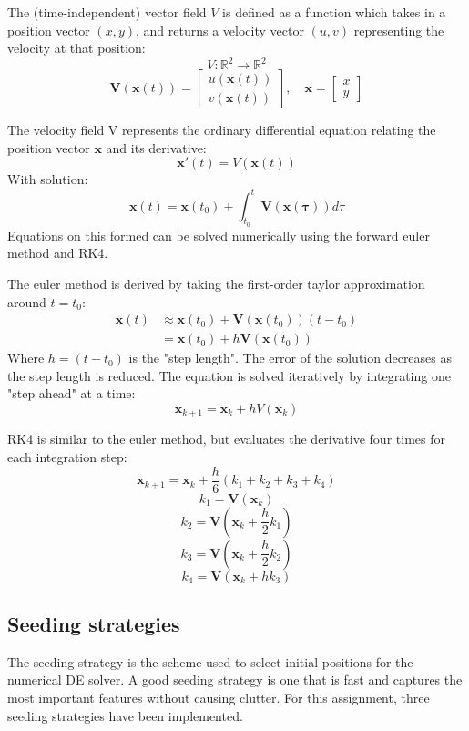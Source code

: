 \documentclass{article}
\begin{document}
The (time-independent) vector field $V$ is defined as a function which takes in a position vector  $(x, y)$, and returns a velocity vector $(u, v)$ representing the velocity at that position:
$$V : \mathbb{R}^2 \rightarrow \mathbb{R}^2 $$
$$\mathbf{V}(\mathbf{x}(t)) = \begin{bmatrix}
    u(\mathbf{x}(t)) \\
    v(\mathbf{x}(t))
\end{bmatrix}, \quad
\mathbf{x} = \begin{bmatrix}
    x\\y
\end{bmatrix}
$$

The velocity field V represents the ordinary differential equation relating 
the position vector $\mathbf{x}$ and its derivative:
$$\mathbf{x}'(t) = V(\mathbf{x}(t))$$
With solution:
$$\mathbf{x}(t) = \mathbf{x}(t_0) + \int_{t_0}^{t} \mathbf{V}(\mathbf{x(\tau)}) d\tau$$
Equations on this formed can be solved numerically using the forward euler method and RK4.

The euler method is derived by taking the first-order taylor approximation around $t = t_0$:
\begin{align*}
    \mathbf{x}(t) &\approx \mathbf{x}(t_0) + \mathbf{V}(\mathbf{x}(t_0))(t-t_0)\\
    &= \mathbf{x}(t_0) + h\mathbf{V}(\mathbf{x}(t_0)) 
\end{align*}
Where $h = (t-t_0)$ is the "step length". The error of the solution decreases as the step length is reduced.
The equation is solved iteratively by integrating one "step ahead" at a time:
$$\mathbf{x}_{k+1} = \mathbf{x}_k + hV(\mathbf{x}_k)$$

RK4 is similar to the euler method, but evaluates the derivative four times for each integration step:
$$\mathbf{x}_{k+1} = \mathbf{x}_k + \frac{h}{6}(k_1+k_2+k_3+k_4)$$
$$k_1 = \mathbf{V}(\mathbf{x}_k)$$
$$k_2 = \mathbf{V}\left(\mathbf{x}_k+\frac{h}{2}k_1\right)$$
$$k_3 = \mathbf{V}\left(\mathbf{x}_k+\frac{h}{2}k_2\right)$$
$$k_4 = \mathbf{V}\left(\mathbf{x}_k+hk_3\right)$$

\subsection{Seeding strategies}
The seeding strategy is the scheme used to select initial positions for the numerical DE solver. 
A good seeding strategy is one that is fast and captures the most important features without causing clutter.
For this assignment, three seeding strategies have been implemented.
\end{document}
